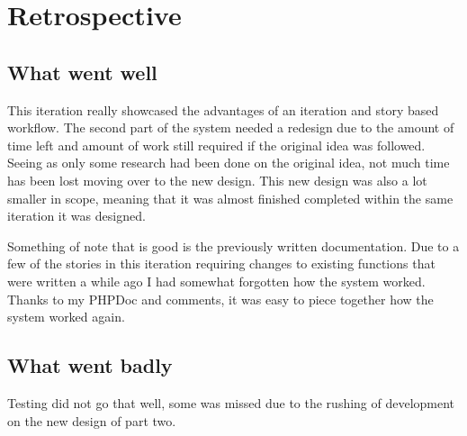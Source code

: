 \documentclass{article}
\begin{document}
\section{Retrospective}
\subsection{What went well}
This iteration really showcased the advantages of an iteration and story based workflow. The second part of the system needed a redesign due to the amount of time left and amount of work still required if the original idea was followed. Seeing as only some research had been done on the original idea, not much time has been lost moving over to the new design. This new design was also a lot smaller in scope, meaning that it was almost finished completed within the same iteration it was designed.

Something of note that is good is the previously written documentation. Due to a few of the stories in this iteration requiring changes to existing functions that were written a while ago I had somewhat forgotten how the system worked. Thanks to my PHPDoc and comments, it was easy to piece together how the system worked again.
\subsection{What went badly}
Testing did not go that well, some was missed due to the rushing of development on the new design of part two.
\end{document}
